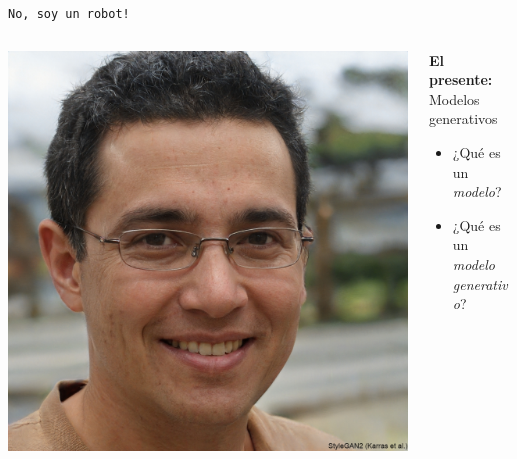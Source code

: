 \documentclass{beamer}
\begin{document}

\begin{frame}{\texttt{No, soy un robot!}}
        \begin{columns}
        \begin{column}{0.4\textwidth}
            \centering
            \includegraphics[width=\textwidth]{thispersondoesnotexist.png}
            \\
        \end{column}
        \begin{column}{0.6\textwidth}
        \textbf{El presente: } Modelos generativos
        \begin{itemize}
            \item ¿Qué es un \textit{modelo}?
            \item ¿Qué es un \textit{modelo generativo}?
        \end{itemize}
        \end{column}
        \end{columns}
\end{frame}
\end{document}
